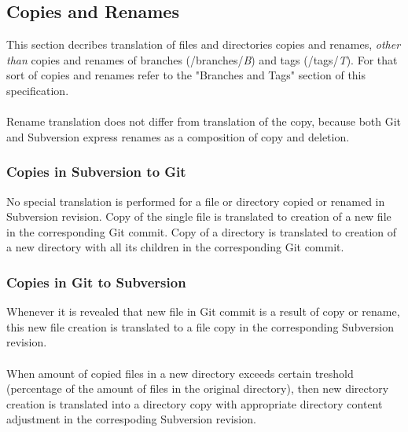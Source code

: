 \subsection{Copies and Renames}
This section decribes translation of files and directories copies and renames, \emph{other than} copies and renames of 
branches (/branches/\emph{B}) and tags (/tags/\emph{T}). For that sort of copies and renames refer to the "Branches and Tags" 
section of this specification.\\\\
Rename translation does not differ from translation of the copy, because both Git and Subversion
express renames as a composition of copy and deletion.%

\subsubsection{Copies in Subversion to Git}
No special translation is performed for a file or directory copied or renamed in Subversion revision. Copy of the single file is translated 
to creation of a new file in the corresponding Git commit. Copy of a directory is translated to creation of a new directory with all its children
in the corresponding Git commit.

\subsubsection{Copies in Git to Subversion}
Whenever it is revealed that new file in Git commit is a result of copy or rename, this new file creation is translated to a file copy in the 
corresponding Subversion revision.\\\\ 
When amount of copied files in a new directory exceeds certain treshold (percentage of the amount of files in the original directory), then new directory
creation is translated into a directory copy with appropriate directory content adjustment in the correspoding Subversion revision.